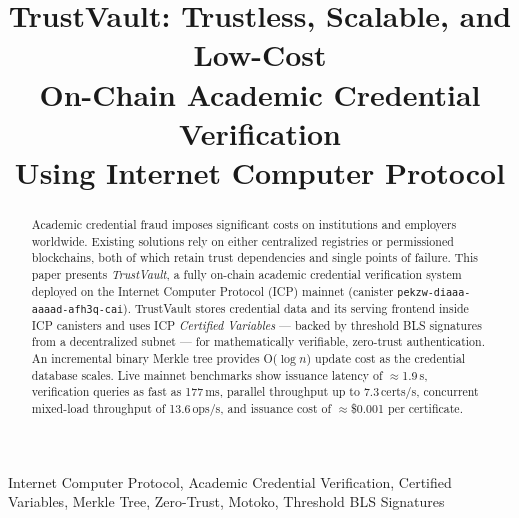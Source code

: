\documentclass[conference]{IEEEtran}
\begin{document}
\title{TrustVault: Trustless, Scalable, and Low-Cost\\On-Chain Academic Credential Verification\\Using Internet Computer Protocol}

\author{
  \and
  
}

\maketitle

\begin{abstract}
Academic credential fraud imposes significant costs on institutions and employers worldwide. Existing solutions rely on either centralized registries or permissioned blockchains, both of which retain trust dependencies and single points of failure. This paper presents \textit{TrustVault}, a fully on-chain academic credential verification system deployed on the Internet Computer Protocol (ICP) mainnet (canister \texttt{pekzw-diaaa-aaaad-afh3q-cai}). TrustVault stores credential data and its serving frontend inside ICP canisters and uses ICP \textit{Certified Variables} — backed by threshold BLS signatures from a decentralized subnet — for mathematically verifiable, zero-trust authentication. An incremental binary Merkle tree provides O($\log n$) update cost as the credential database scales. Live mainnet benchmarks show issuance latency of $\approx$1.9\,s, verification queries as fast as 177\,ms, parallel throughput up to 7.3\,certs/s, concurrent mixed-load throughput of 13.6\,ops/s, and issuance cost of $\approx$\$0.001 per certificate.
\end{abstract}

\begin{IEEEkeywords}
Internet Computer Protocol, Academic Credential Verification, Certified Variables, Merkle Tree, Zero-Trust, Motoko, Threshold BLS Signatures
\end{IEEEkeywords}
\end{document}
